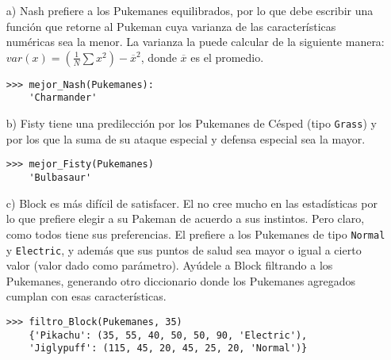   \begin{itemize}
  \item[a)]
    Nash prefiere a los Pukemanes equilibrados,
    por lo que debe escribir una función
    que retorne al Pukeman cuya varianza de las características
    numéricas sea la menor.
    La varianza la puede calcular de la siguiente manera:
    \(var(x) = \left( \frac{1}{N} \sum x^2 \right) - \overline{x}^2\),
    donde \(\overline{x}\) es el promedio.
    
    \begin{lstlisting}[style = consola]
    >>> mejor_Nash(Pukemanes):
    'Charmander'
    \end{lstlisting}
  \item[b)]
    Fisty tiene una predilección por los
    Pukemanes de Césped
    (tipo \texttt{Grass})
    y por los que la suma de su ataque especial
    y defensa especial sea la mayor.
    
    \begin{lstlisting}[style = consola]
    >>> mejor_Fisty(Pukemanes)
    'Bulbasaur'
    \end{lstlisting}
  \item[c)]
    Block es más difícil de satisfacer.
    El no cree mucho en las estadísticas
    por lo que prefiere elegir a su Pakeman
    de acuerdo a sus instintos.
    Pero claro,
    como todos tiene sus preferencias.
    El prefiere a los Pukemanes de tipo
    \texttt{Normal} y \texttt{Electric},
    y además que sus puntos de salud sea
    mayor o igual a cierto valor
    (valor dado como parámetro).
    Ayúdele a Block filtrando a los Pukemanes,
    generando otro diccionario donde los Pukemanes
    agregados cumplan con esas características.
    
    \begin{lstlisting}[style=consola]
    >>> filtro_Block(Pukemanes, 35)
    {'Pikachu': (35, 55, 40, 50, 50, 90, 'Electric'),
    'Jiglypuff': (115, 45, 20, 45, 25, 20, 'Normal')}
    \end{lstlisting}
  \end{itemize}